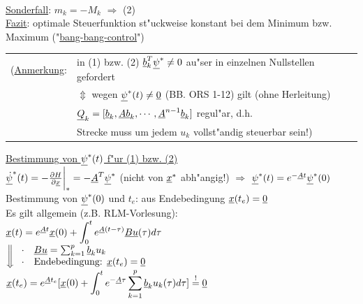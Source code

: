 \documentclass[openany,a4paper,11pt]{book}
\begin{document}
\begin{enumerate}
\\
    \uline{Sonderfall}: $m_k=-M_k$ $\Rightarrow$  \quad (2)\\
    \uline{Fazit}: optimale Steuerfunktion st"uckweise konstant bei dem Minimum bzw. Maximum ("\uline{bang-bang-control}")\\
    \begin{tabular}{ll}
        (\uline{Anmerkung}:& in (1) bzw. (2) $\uline{b}_k^T\uline{\psi}^*\neq0$ au"ser in einzelnen Nullstellen gefordert\\
        & $\Updownarrow$ wegen $\uline{\psi}^*(t)\neq\uline{0}$ (BB. ORS 1-12) gilt (ohne Herleitung)\\
        & $\uline{Q}_k=[\uline{b}_k, \uline{Ab}_k, \cdots, \uline{A}^{n-1}\uline{b}_k]$ regul"ar, d.h.\\
        & Strecke muss um jedem $u_k$ vollst"andig steuerbar sein!)
    \end{tabular}
    \uline{Bestimmung von $\uline{\psi}^*(t)$ f"ur (1) bzw. (2)}\\
    $\uline{\dot{\psi}}^*(t)=-\frac{\partial H}{\partial\uline{x}} \bigg|_*=-\uline{A}^T\uline{\psi}^*$ (nicht von $\uline{x}^*$ abh"angig!) $\Rightarrow$ $\uline{\psi}^*(t)=e^{-\uline{A}t}\uline{\psi}^*(0)$\\
    Bestimmung von $\uline{\psi}^*(0)$ und $t_e$: aus Endebedingung $\uline{x}(t_e)=\uline{0}$\\
    Es gilt allgemein (z.B. RLM-Vorlesung):\\
    $\displaystyle\uline{x}(t)=e^{\uline{A}t}\uline{x}(0)+\int_0^te^{\uline{A}(t-\tau)}\uline{Bu}(\tau)d\tau$\\
    $\bigg\Downarrow \left.
    \begin{array}{ll}
    \cdot \quad \uline{Bu}=\sum_{k=1}^p\uline{b}_ku_k\\
    \cdot \quad \text{Endebedingung: } \uline{x}(t_e)=\uline{0}\\
    \end{array} \right.$\\
    $\displaystyle\uline{x}(t_e)=e^{\uline{A}t_e}[\uline{x}(0)+\int_0^te^{-\uline{A}\tau}\sum_{k=1}^p\uline{b}_ku_k(\tau)d\tau]\stackrel{!}{=}\uline{0}$\\

\end{enumerate}
\end{document}
